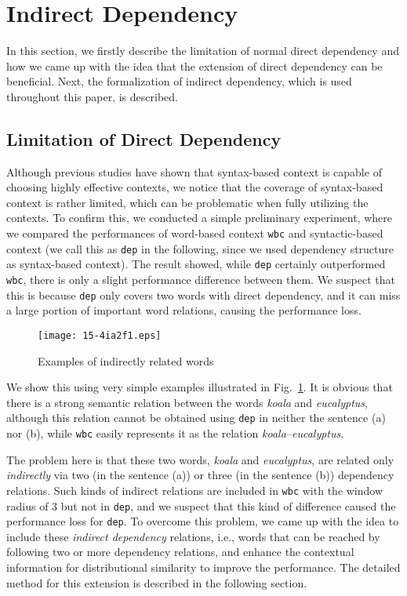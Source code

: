 \documentclass[english]{jnlp_1.4}
\begin{document}
\section{Indirect Dependency}

In this section, we firstly describe the limitation of normal direct
dependency and how we came up with the idea that the extension of
direct dependency can be beneficial. Next, the formalization of
indirect dependency, which is used throughout this paper, is
described.

\subsection{Limitation of Direct Dependency}


Although previous studies have shown that syntax-based context is
capable of choosing highly effective contexts, we notice that the
coverage of syntax-based context is rather limited, which can be
problematic when fully utilizing the contexts. To confirm this, we
conducted a simple preliminary experiment, where we compared the
performances of word-based context {\tt wbc} and syntactic-based
context (we call this as {\tt dep} in the following, since we used
dependency structure as syntax-based context). The result showed,
while {\tt dep} certainly outperformed {\tt wbc}, there is only a
slight performance difference between them. We suspect that this is
because {\tt dep} only covers two words with direct dependency, and it
can miss a large portion of important word relations, causing the
performance loss.

\begin{figure}[b]
\begin{center}
\texttt{[image: 15-4ia2f1.eps]}
\caption{Examples of indirectly related words}
\label{fig_id_example}
\end{center}
\end{figure}

We show this using very simple examples illustrated in Fig.~\ref{fig_id_example}. 
It is obvious that there is a strong semantic
relation between the words {\em koala} and {\em eucalyptus}, although
this relation cannot be obtained using {\tt dep} in neither the
sentence (a) nor (b), while {\tt wbc} easily represents it as the
relation {\em koala--eucalyptus}.

The problem here is that these two words, {\em koala} and {\em
eucalyptus}, are related only {\em indirectly} via two (in the
sentence (a)) or three (in the sentence (b)) dependency
relations. Such kinds of indirect relations are included in {\tt wbc}
with the window radius of 3 but not in {\tt dep}, and we suspect that
this kind of difference caused the performance loss for {\tt dep}. To
overcome this problem, we came up with the idea to include these {\em
indirect dependency} relations, i.e., words that can be reached by
following two or more dependency relations, and enhance the contextual
information for distributional similarity to improve the performance.
The detailed method for this extension is described in the following
section.
\end{document}
